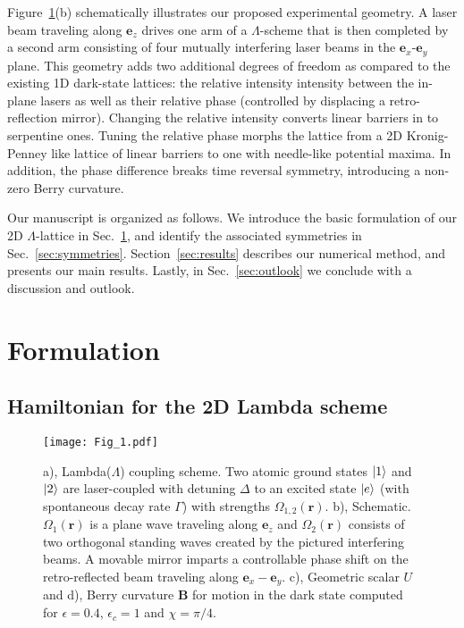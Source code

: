 \documentclass[aps,pra,twocolumn,showpacs,superscriptaddress,floatfix,longbibliography]{revtex4-1}
\def\Udd{U}
\def\Bdd{{\mathbf B}}
\def\ex{\boldsymbol{e}_x}
\def\ey{\boldsymbol{e}_y}
\def\ez{\boldsymbol{e}_z}
\begin{document}
Figure~\ref{fig:setup}(b) schematically illustrates our proposed experimental geometry.
A laser beam traveling along $\ez$ drives one arm of a $\Lambda$-scheme that is then completed by a second arm consisting of four mutually interfering laser beams in the $\ex$-$\ey$ plane.
This geometry adds two additional degrees of freedom as compared to the existing 1D dark-state lattices: the relative intensity intensity between the in-plane lasers as well as their relative phase (controlled by displacing a retro-reflection mirror).
Changing the relative intensity converts linear barriers in to serpentine ones.
Tuning the relative phase morphs the lattice from a 2D Kronig-Penney like lattice of linear barriers to one with needle-like potential maxima.
In addition, the phase difference breaks time reversal symmetry, introducing a non-zero Berry curvature.

Our manuscript is organized as follows.
We introduce the basic formulation of our 2D $\Lambda$-lattice in Sec.~\ref{sec:formulation}, and identify the associated symmetries in Sec.~\ref{sec:symmetries}.
Section~\ref{sec:results} describes our numerical method, and presents our main results.
Lastly, in Sec.~\ref{sec:outlook} we conclude with a discussion and outlook.

\section{Formulation}\label{sec:formulation}

\subsection{Hamiltonian for the 2D Lambda scheme }

\begin{figure}[t]
\centering
  \texttt{[image: Fig\_1.pdf]}
  \caption{a), Lambda($\Lambda$) coupling scheme.
Two atomic ground states $\protect\ket1$ and $\protect\ket2$ are laser-coupled with detuning $\Delta$ to an excited state $\protect\ket e$ (with spontaneous decay rate $\Gamma$)
with strengths $\Omega_{1,2}(\boldsymbol{r})$.
b), Schematic. $\Omega_{1}(\boldsymbol{r})$ is a plane wave traveling along $\ez$ and $\Omega_{2}(\boldsymbol{r})$ consists of two orthogonal standing waves created by the pictured interfering beams.
A movable mirror imparts a controllable phase shift on the retro-reflected beam traveling along $\ex-\ey$.
c), Geometric scalar $\Udd$ and d), Berry curvature $\Bdd$ for motion in the dark state computed for $\epsilon = 0.4$, $\epsilon_c = 1$ and $\chi = \pi / 4$. }
  \label{fig:setup}
\end{figure}
\end{document}
